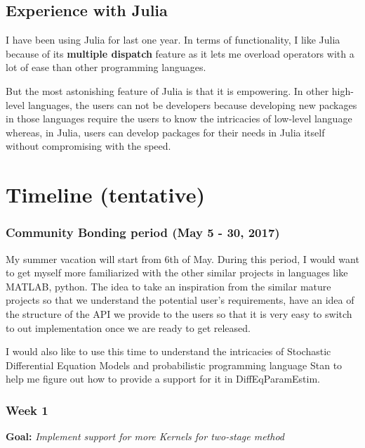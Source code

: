 \documentclass[11pt]{article}
\begin{document}
\subsection{Experience with Julia}\label{experience-with-julia}

I have been using Julia for last one year. In terms of functionality, I
like Julia because of its \textbf{multiple dispatch} feature as it lets
me overload operators with a lot of ease than other programming
languages.

But the most astonishing feature of Julia is that it is empowering. In
other high-level languages, the users can not be developers because
developing new packages in those languages require the users to know the
intricacies of low-level language whereas, in Julia, users can develop
packages for their needs in Julia itself without compromising with the
speed.

    \section{Timeline (tentative)}\label{timeline-tentative}

    \subsubsection{Community Bonding period (May 5 - 30,
2017)}\label{community-bonding-period-may-5---30-2017}

My summer vacation will start from 6th of May. During this period, I
would want to get myself more familiarized with the other similar
projects in languages like MATLAB, python. The idea to take an
inspiration from the similar mature projects so that we understand the
potential user's requirements, have an idea of the structure of the API
we provide to the users so that it is very easy to switch to out
implementation once we are ready to get released.

I would also like to use this time to understand the intricacies of
Stochastic Differential Equation Models and probabilistic programming
language Stan to help me figure out how to provide a support for it in
DiffEqParamEstim.

    \subsubsection{Week 1}\label{week-1}

\textbf{Goal:} \emph{Implement support for more Kernels for two-stage
method}
\end{document}
